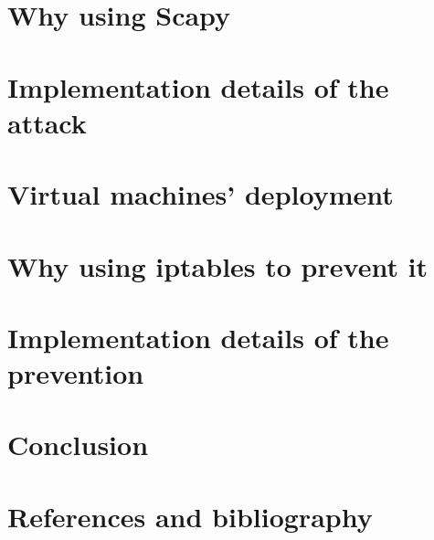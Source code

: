 \documentclass[11pt]{article}
\begin{document}
\clearpage

\section{Why using Scapy}


\clearpage

\section{Implementation details of the attack}


\clearpage

\section{Virtual machines' deployment}


\clearpage

\section{Why using iptables to prevent it}


\clearpage

\section{Implementation details of the prevention}


\clearpage

\section{Conclusion}


\clearpage

\section{References and bibliography}

\printindex
\end{document}
